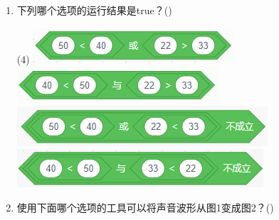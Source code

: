 \documentclass[10pt, a4paper]{article}
\newcommand{\hq}{\hfill(\qquad)}
\begin{document}
\begin{enumerate}
        \item 下列哪个选项的运行结果是true？\hq
        \begin{tasks}(4)
            \task \includegraphics[width=.16\textwidth]{figure/15a.png}
            \task \includegraphics[width=.16\textwidth]{figure/15b.png}
            \task \includegraphics[width=.18\textwidth]{figure/15c.png}
            \task \includegraphics[width=.18\textwidth]{figure/15d.png}
        \end{tasks}

        \item 使用下面哪个选项的工具可以将声音波形从图1变成图2？\hq
        

\end{enumerate}
\end{document}
